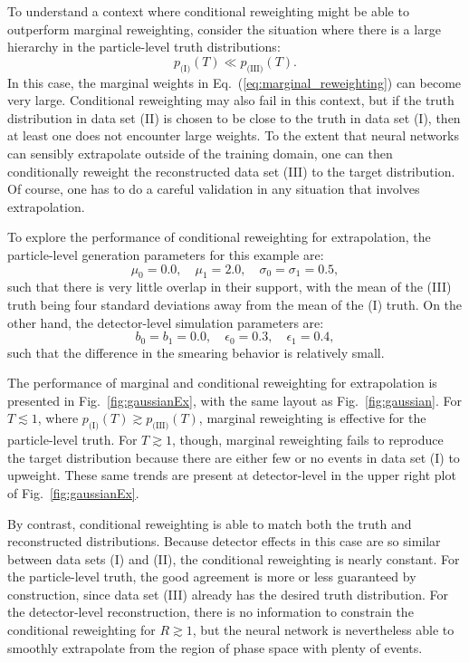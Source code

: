 \documentclass[aps,prx,reprint,preprintnumbers,superscriptaddress,nofootinbib,longbibliography,floatfix]{revtex4-2}
\DeclareRobustCommand{\Fig}[1]{Fig.~\ref{fig:#1}}
\DeclareRobustCommand{\Eq}[1]{Eq.~(\ref{eq:#1})}
\begin{document}
To understand a context where conditional reweighting might be able to outperform marginal reweighting, consider the situation where there is a large hierarchy in the particle-level truth distributions:
%
\begin{equation}
    p_{\text{(I)}}(T) \ll p_{\text{(III)}}(T).
\end{equation}
%
In this case, the marginal weights in \Eq{marginal_reweighting} can become very large.
%
Conditional reweighting may also fail in this context, but if the truth distribution in data set (II) is chosen to be close to the truth in data set (I), then at least one does not encounter large weights.
%
To the extent that neural networks can sensibly extrapolate outside of the training domain, one can then conditionally reweight the reconstructed data set (III) to the target distribution.
%
Of course, one has to do a careful validation in any situation that involves extrapolation.


To explore the performance of conditional reweighting for extrapolation, the particle-level generation parameters for this example are:
%
\begin{equation}
\mu_0=0.0, \quad \mu_1=2.0, \quad \sigma_0 = \sigma_1 = 0.5,
\end{equation}
%
such that there is very little overlap in their support, with the mean of the (III) truth being four standard deviations away from the mean of the (I) truth.
%
On the other hand, the detector-level simulation parameters are:
%
\begin{equation}
b_0=b_1=0.0, \quad \epsilon_0=0.3, \quad \epsilon_1=0.4,
\end{equation}
%
such that the difference in the smearing behavior is relatively small.


The performance of marginal and conditional reweighting for extrapolation is presented in \Fig{gaussianEx}, with the same layout as \Fig{gaussian}.
%
For $T\lesssim 1$, where $p_{\text{(I)}}(T)\gtrsim p_{\text{(III)}}(T)$, marginal reweighting is effective for the particle-level truth.
%
For $T\gtrsim 1$, though, marginal reweighting fails to reproduce the target distribution because there are either few or no events in data set (I) to upweight.
%
These same trends are present at detector-level in the upper right plot of \Fig{gaussianEx}.


By contrast, conditional reweighting is able to match both the truth and reconstructed distributions.
%
Because detector effects in this case are so similar between data sets (I) and (II), the conditional reweighting is nearly constant.
%
For the particle-level truth, the good agreement is more or less guaranteed by construction, since data set (III) already has the desired truth distribution.
%
For the detector-level reconstruction, there is no information to constrain the conditional reweighting for $R\gtrsim 1$, but the neural network is nevertheless able to smoothly extrapolate from the region of phase space with plenty of events.
\end{document}
